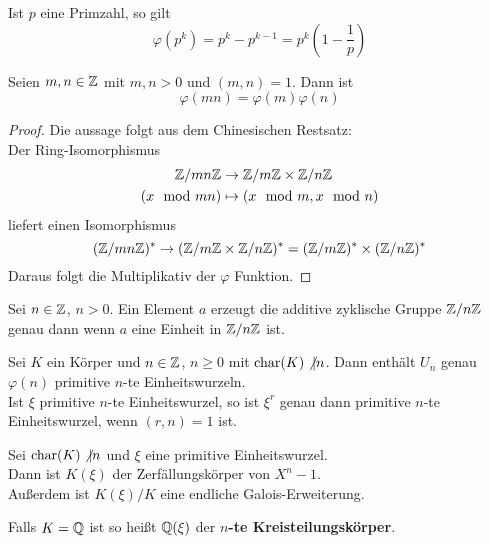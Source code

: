 	\begin{lem}
		Ist $p$ eine Primzahl, so gilt
		\[\varphi(p^k)=p^k-p^{k-1}=p^k(1-\frac{1}{p})\]
	\end{lem}

	\begin{satz}
		Seien $m,n\in\mathbb{Z}$ mit $m,n>0$ und $(m,n)=1$. Dann ist
		\[\varphi(mn)=\varphi(m)\varphi(n)\]
	\end{satz}
	\begin{proof}
		Die aussage folgt aus dem Chinesischen Restsatz:\\
		Der Ring-Isomorphismus
		\begin{align*}
		\mathbb{Z}/mn\mathbb{Z}&\to \mathbb{Z}/m\mathbb{Z}\times \mathbb{Z}/n\mathbb{Z}\\
		(x\mod mn)&\mapsto(x\mod m,x\mod n)
		\end{align*}
		liefert einen Isomorphismus
		\[(\mathbb{Z}/mn\mathbb{Z})^*\to(\mathbb{Z}/m\mathbb{Z}\times \mathbb{Z}/n\mathbb{Z})^*=(\mathbb{Z}/m\mathbb{Z})^*\times (\mathbb{Z}/n\mathbb{Z})^*\]
		Daraus folgt die Multiplikativ der $\varphi$ Funktion.
	\end{proof}

	\begin{satz}
		Sei $n\in\mathbb{Z}$, $n>0$. Ein Element $a$ erzeugt die additive zyklische Gruppe $\mathbb{Z}/n\mathbb{Z}$ genau dann wenn $a$ eine Einheit in $\mathbb{Z}/n\mathbb{Z}$ ist.
	\end{satz}

	\begin{satz}
		Sei $K$ ein Körper und $n\in\mathbb{Z}$, $n\geq0$ mit $\operatorname{char}(K)\not|n$. Dann enthält $U_n$ genau $\varphi(n)$ primitive $n$-te Einheitswurzeln.\\
		Ist $\xi$ primitive $n$-te Einheitswurzel, so ist $\xi^r$ genau dann primitive $n$-te Einheitswurzel, wenn $(r,n)=1$ ist.
	\end{satz}
	
	
	\begin{satz}
		Sei $\operatorname{char}(K)\not|n$ und $\xi$ eine primitive Einheitswurzel.\\
		Dann ist $K(\xi)$ der Zerfällungskörper
		 von $X^n-1$.\\
		 Außerdem ist $K(\xi)/K$ eine endliche Galois-Erweiterung.
	\end{satz}
	\begin{definition}
		Falls $K=\mathbb{Q}$ ist so heißt $\mathbb{Q}(\xi)$ der \textbf{$n$-te Kreisteilungskörper}.
	\end{definition}

